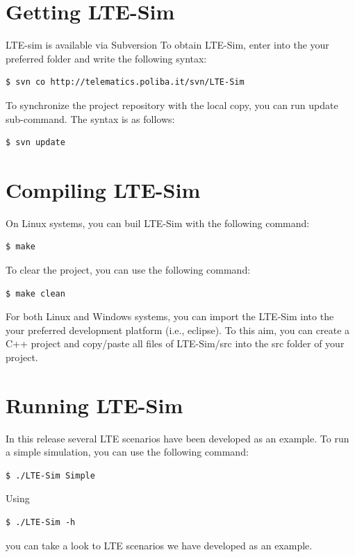 \documentclass[11pt]{article}
\begin{document}
\section{Getting LTE-Sim}
LTE-sim is available via Subversion To obtain LTE-Sim, enter into the your preferred folder and
write the following syntax:
\color{blue}
\begin{lstlisting}
$ svn co http://telematics.poliba.it/svn/LTE-Sim 
\end{lstlisting}
\color{black}
To synchronize the project repository with the local copy, you can run update sub-command. The syntax is as follows:
\color{blue}
\begin{lstlisting}
$ svn update
\end{lstlisting}
\color{black}

\section{Compiling LTE-Sim}
On Linux systems, you can buil LTE-Sim with the following command:
\color{blue}
\begin{lstlisting}
$ make
\end{lstlisting}
\color{black}

To clear the project, you can use the following command:
\color{blue}
\begin{lstlisting}
$ make clean
\end{lstlisting}
\color{black}

For both Linux and Windows systems, you can import the LTE-Sim into the your preferred development platform (i.e., eclipse). To this aim, you can create a C++ project and copy/paste all files of LTE-Sim/src into the src folder of your project.  


\section{Running LTE-Sim}
In this release several LTE scenarios have been developed as an example. To run a simple simulation, you can use the following command:
\color{blue}
\begin{lstlisting}
$ ./LTE-Sim Simple
\end{lstlisting}
\color{black}

Using 
\color{blue}
\begin{lstlisting}
$ ./LTE-Sim -h
\end{lstlisting}
\color{black}
you can take a look to LTE scenarios we have developed as an example.
\end{document}
